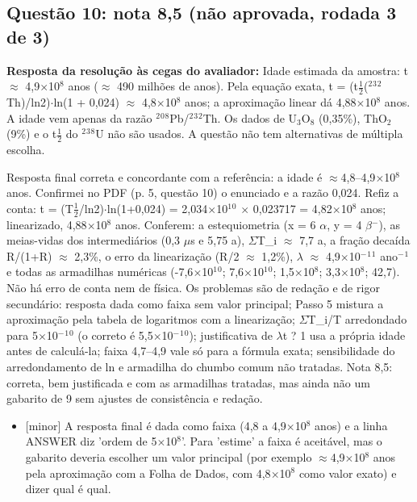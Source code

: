 \documentclass{article}%
\begin{document}
\subsection*{Questão 10: nota 8,5 (não aprovada, rodada 3 de 3)}%
\textbf{Resposta da resolução às cegas do avaliador:} Idade estimada da amostra: t $\approx$ 4,9$\times$10$^{8}$ anos ($\approx$ 490 milhões de anos). Pela equação exata, t = (t$\frac12$($^2$$^3$$^2$Th)/ln2)$\cdot$ln(1 + 0,024) $\approx$ 4,8$\times$10$^{8}$ anos; a aproximação linear dá 4,88$\times$10$^{8}$ anos. A idade vem apenas da razão $^2$$^{0}$$^{8}$Pb/$^2$$^3$$^2$Th. Os dados de U$_{3}$O$_{8}$ (0,35\%), ThO$_{2}$ (9\%) e o t$\frac12$ do $^2$$^3$$^{8}$U não são usados. A questão não tem alternativas de múltipla escolha.\par %
Resposta final correta e concordante com a referência: a idade é $\approx$4,8--4,9$\times$10$^{8}$ anos. Confirmei no PDF (p. 5, questão 10) o enunciado e a razão 0,024. Refiz a conta: t = (T$\frac12$/ln2)$\cdot$ln(1+0,024) = 2,034$\times$10$^{1}$$^{0}$ $\times$ 0,023717 = 4,82$\times$10$^{8}$ anos; linearizado, 4,88$\times$10$^{8}$ anos. Conferem: a estequiometria (x = 6 $\alpha$, y = 4 $\beta$$^{-}$), as meias{-}vidas dos intermediários (0,3 $\mu$s e 5,75 a), $\Sigma$T\_i $\approx$ 7,7 a, a fração decaída R/(1+R) $\approx$ 2,3\%, o erro da linearização (R/2 $\approx$ 1,2\%), $\lambda$ $\approx$ 4,9$\times$10$^{-}$$^{1}$$^{1}$ ano$^{-}$$^{1}$ e todas as armadilhas numéricas (-7,6$\times$10$^{1}$$^{0}$; 7,6$\times$10$^{1}$$^{0}$; 1,5$\times$10$^{8}$; 3,3$\times$10$^{8}$; 42,7). Não há erro de conta nem de física. Os problemas são de redação e de rigor secundário: resposta dada como faixa sem valor principal; Passo 5 mistura a aproximação pela tabela de logaritmos com a linearização; $\Sigma$T\_i/T arredondado para 5$\times$10$^{-}$$^{1}$$^{0}$ (o correto é 5,5$\times$10$^{-}$$^{1}$$^{0}$); justificativa de $\lambda$t ? 1 usa a própria idade antes de calculá{-}la; faixa 4,7--4,9 vale só para a fórmula exata; sensibilidade do arredondamento de ln e armadilha do chumbo comum não tratadas. Nota 8,5: correta, bem justificada e com as armadilhas tratadas, mas ainda não um gabarito de 9 sem ajustes de consistência e redação.%
\begin{itemize}%
\item%
{[}minor{]} A resposta final é dada como faixa (4,8 a 4,9$\times$10$^{8}$ anos) e a linha ANSWER diz 'ordem de 5$\times$10$^{8}$'. Para 'estime' a faixa é aceitável, mas o gabarito deveria escolher um valor principal (por exemplo $\approx$4,9$\times$10$^{8}$ anos pela aproximação com a Folha de Dados, com 4,8$\times$10$^{8}$ como valor exato) e dizer qual é qual.%

\end{itemize}$$
\end{document}
